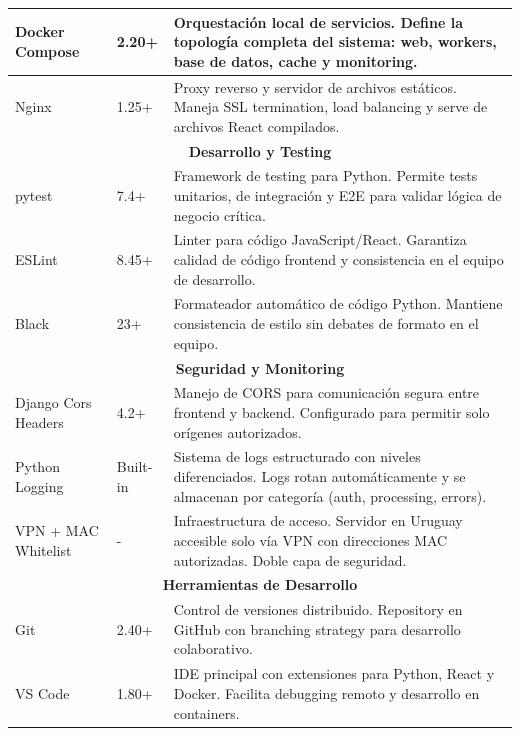 \begin{longtable}{|p{3cm}|p{3cm}|p{7cm}|}
Docker Compose & 2.20+ & Orquestación local de servicios. Define la topología completa del sistema: web, workers, base de datos, cache y monitoring. \\
\hline

Nginx & 1.25+ & Proxy reverso y servidor de archivos estáticos. Maneja SSL termination, load balancing y serve de archivos React compilados. \\
\hline

\multicolumn{3}{|c|}{\textbf{Desarrollo y Testing}} \\
\hline

pytest & 7.4+ & Framework de testing para Python. Permite tests unitarios, de integración y E2E para validar lógica de negocio crítica. \\
\hline

ESLint & 8.45+ & Linter para código JavaScript/React. Garantiza calidad de código frontend y consistencia en el equipo de desarrollo. \\
\hline

Black & 23+ & Formateador automático de código Python. Mantiene consistencia de estilo sin debates de formato en el equipo. \\
\hline

\multicolumn{3}{|c|}{\textbf{Seguridad y Monitoring}} \\
\hline

Django Cors Headers & 4.2+ & Manejo de CORS para comunicación segura entre frontend y backend. Configurado para permitir solo orígenes autorizados. \\
\hline

Python Logging & Built-in & Sistema de logs estructurado con niveles diferenciados. Logs rotan automáticamente y se almacenan por categoría (auth, processing, errors). \\
\hline

VPN + MAC Whitelist & - & Infraestructura de acceso. Servidor en Uruguay accesible solo vía VPN con direcciones MAC autorizadas. Doble capa de seguridad. \\
\hline

\multicolumn{3}{|c|}{\textbf{Herramientas de Desarrollo}} \\
\hline

Git & 2.40+ & Control de versiones distribuido. Repository en GitHub con branching strategy para desarrollo colaborativo. \\
\hline

VS Code & 1.80+ & IDE principal con extensiones para Python, React y Docker. Facilita debugging remoto y desarrollo en containers. \\
\hline

\end{longtable}

